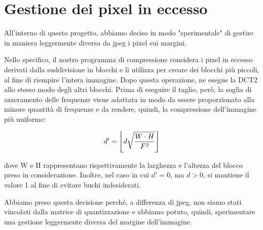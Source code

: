 \section{Gestione dei pixel in eccesso}\label{sec:border}

All'interno di questo progetto, abbiamo deciso in modo "sperimentale" di gestire in maniera leggermente diversa da jpeg i pixel sui margini.

Nello specifico, il nostro programma di compressione considera i pixel in eccesso derivati dalla suddivisione in blocchi e li utilizza per creare dei blocchi più piccoli, al fine di riempire l'intera immagine. Dopo questa operazione, ne esegue la DCT2 allo stesso modo degli altri blocchi. Prima di eseguire il taglio, però, la soglia di azzeramento delle frequenze viene adattata in modo da essere proporzionato alla minore quantità di frequenze e da rendere, quindi, la compressione dell'immagine più uniforme:

$$d' = \floor*{d  \sqrt{ \frac{W \cdot H}{F^{2}}}}$$

dove W e H rappresentano rispettivamente la larghezza e l'altezza del blocco preso in considerazione.
Inoltre, nel caso in cui $d'=0$, ma $d>0$, si mantiene il valore 1 al fine di evitare buchi indesiderati.

Abbiamo preso questa decisione perché, a differenza di jpeg, non siamo stati vincolati dalla matrice di quantizzazione e abbiamo potuto, quindi, sperimentare una gestione leggermente diversa del margine dell'immagine.


